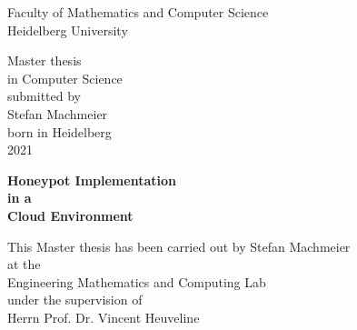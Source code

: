 \thispagestyle{empty}
\begin{center}
  \renewcommand{\baselinestretch}{2.00}
  \Large\sffamily
  Faculty of Mathematics and Computer Science\\
  \large Heidelberg University
  \par\vfill\normalfont
  Master thesis\\
  in Computer Science\\
  submitted by\\
  Stefan Machmeier\\
  born in Heidelberg\\
  2021
\end{center}
\newpage

\thispagestyle{empty}
\begin{center}
  \renewcommand{\baselinestretch}{2.00}
  \Large\bfseries\sffamily
    Honeypot Implementation\\
    in a\\
    Cloud Environment
  \par
  \vfill
  \large\normalfont
  This Master thesis has been carried out by Stefan Machmeier\\
  at the\\
  Engineering Mathematics and Computing Lab\\
  under the supervision of\\
  Herrn Prof. Dr. Vincent Heuveline
\end{center}\par
\vspace{5\baselineskip}

\renewcommand{\baselinestretch}{1.00}\normalsize
